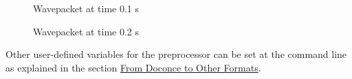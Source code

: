 \documentclass[a4paper]{article}
\begin{document}
\begin{figure}
\noindent{}
\caption{Wavepacket at time 0.1 s}
\end{figure}
\begin{figure}
\noindent{}
\caption{Wavepacket at time 0.2 s}
\end{figure}

Other user-defined variables for the preprocessor can be set at
the command line as explained in the section \hyperref[from-doconce-to-other-formats]{From Doconce to Other Formats}.
\end{document}
